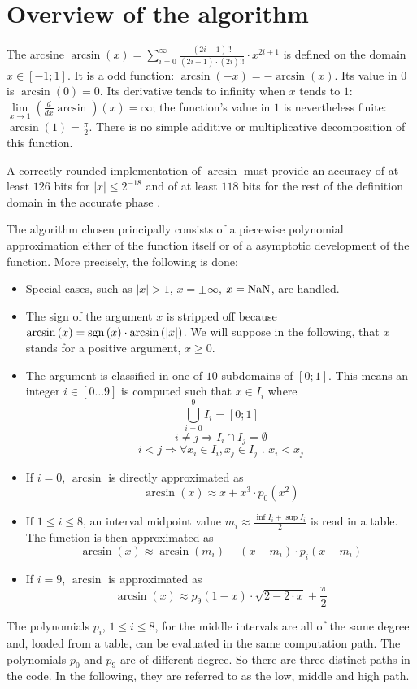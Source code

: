 \section{Overview of the algorithm}
The arcsine $\arcsin\left( x \right) = \sum\limits_{i=0}^{\infty}
\frac{\left( 2i - 1 \right)!!}{\left(2i+1\right) \cdot \left( 2i
\right)!!} \cdot x^{2i+1}$ is defined on the domain $x \in \left[ -1;
1 \right]$. It is a odd function: $\arcsin\left(-x\right) =
-\arcsin\left( x \right)$. Its value in $0$ is $\arcsin\left( 0
\right) = 0$. Its derivative tends to infinity when $x$ tends to $1$:
$\lim\limits_{x \rightarrow 1} \left( \frac{d}{dx} \arcsin
\right)\left(x\right) = \infty$; the function's value in $1$ is
nevertheless finite: $\arcsin\left( 1 \right) = \frac{\pi}{2}$.  There
is no simple additive or multiplicative decomposition of this
function.

A correctly rounded implementation of $\arcsin$ must provide an
accuracy of at least $126$ bits for $\left \vert x \right \vert \leq
2^{-18}$ and of at least $118$ bits for the rest of the definition
domain in the accurate phase \cite{DinDefLau2004LIP}.

The algorithm chosen principally consists of a piecewise polynomial
approximation either of the function itself or of a asymptotic
development of the function. More precisely, the following is done:
\begin{itemize}
\item Special cases, such as $\left \vert x \right \vert > 1$, $x = \pm \infty$, $x = \mathrm{NaN}$, are handled.
\item The sign of the argument $x$ is stripped off because
$\arcsin\left(x\right) = \mathrm{sgn}\left(x\right) \cdot \arcsin\left( \left
\vert x \right \vert \right)$. We will suppose in the following, that
$x$ stands for a positive argument, $x \geq 0$.
\item The argument is classified in one of $10$ subdomains of $\left[
0; 1 \right]$.  This means an integer $i \in \left[0\dots9\right]$ is
computed such that $x \in I_i$ where
$$\bigcup\limits_{i=0}^9 I_i = \left[0; 1 \right]$$
$$i \not= j \Rightarrow I_i \cap I_j = \emptyset$$
$$i < j \Rightarrow \forall x_i \in I_i, x_j \in I_j \mbox{ . } x_i < x_j$$
\item If $i = 0$, $\arcsin$ is directly approximated as 
$$\arcsin\left( x \right) \approx x + x^3 \cdot p_0\left( x^2 \right)$$
\item If $1 \leq i \leq 8$, an interval midpoint value $m_i
\approx \frac{\inf I_i + \sup I_i}{2}$ is read in a table.  The function is
then approximated as
$$\arcsin\left( x \right) \approx \arcsin\left( m_i \right) +  \left(x - m_i \right) \cdot p_i\left( x - m_i \right)$$
\item If $i = 9$, $\arcsin$ is approximated as 
$$\arcsin\left( x \right) \approx p_9\left( 1 - x \right) \cdot \sqrt{2 - 2\cdot x} + \frac{\pi}{2}$$
\end{itemize}
The polynomials $p_i$, $1 \leq i \leq 8$, for the middle intervals are
all of the same degree and, loaded from a table, can be evaluated in
the same computation path. The polynomials $p_0$ and $p_9$ are of
different degree. So there are three distinct paths in the code. In
the following, they are referred to as the low, middle and high path.

